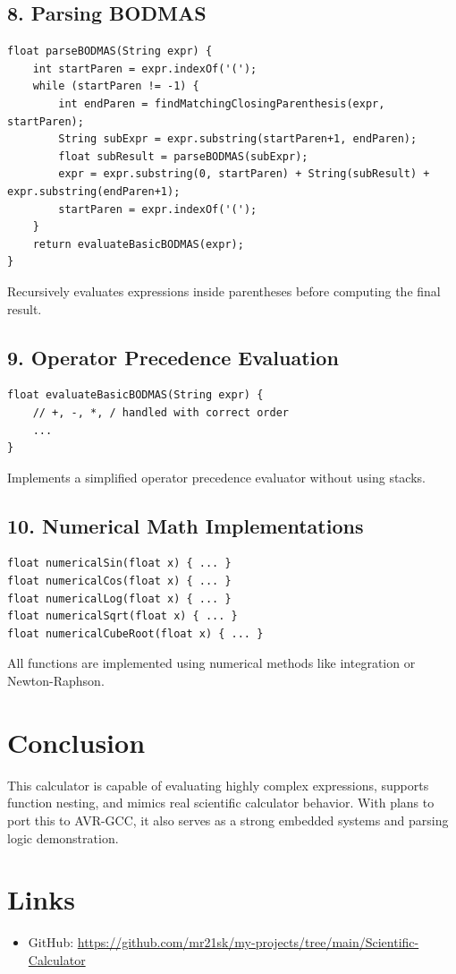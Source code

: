 \documentclass[12pt]{article}
\begin{document}
\subsection*{8. Parsing BODMAS}
\begin{lstlisting}
float parseBODMAS(String expr) {
    int startParen = expr.indexOf('(');
    while (startParen != -1) {
        int endParen = findMatchingClosingParenthesis(expr, startParen);
        String subExpr = expr.substring(startParen+1, endParen);
        float subResult = parseBODMAS(subExpr);
        expr = expr.substring(0, startParen) + String(subResult) + expr.substring(endParen+1);
        startParen = expr.indexOf('(');
    }
    return evaluateBasicBODMAS(expr);
}
\end{lstlisting}
Recursively evaluates expressions inside parentheses before computing the final result.

\subsection*{9. Operator Precedence Evaluation}
\begin{lstlisting}
float evaluateBasicBODMAS(String expr) {
    // +, -, *, / handled with correct order
    ...
}
\end{lstlisting}
Implements a simplified operator precedence evaluator without using stacks.

\subsection*{10. Numerical Math Implementations}
\begin{lstlisting}
float numericalSin(float x) { ... }
float numericalCos(float x) { ... }
float numericalLog(float x) { ... }
float numericalSqrt(float x) { ... }
float numericalCubeRoot(float x) { ... }
\end{lstlisting}
All functions are implemented using numerical methods like integration or Newton-Raphson.

\section*{Conclusion}
This calculator is capable of evaluating highly complex expressions, supports function nesting, and mimics real scientific calculator behavior. With plans to port this to AVR-GCC, it also serves as a strong embedded systems and parsing logic demonstration.

\section*{Links}
\begin{itemize}
	\item GitHub: \url{https://github.com/mr21sk/my-projects/tree/main/Scientific-Calculator}
\end{itemize}
\end{document}

